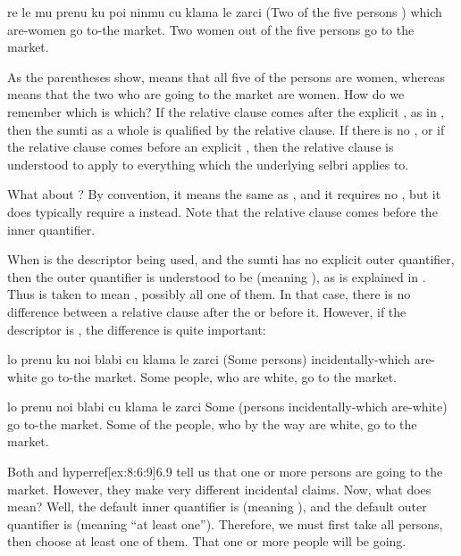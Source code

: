 \begin{example}
re le mu prenu ku poi ninmu\n
\T	cu klama le zarci\n
(Two of the five persons ) which are-women\n
\T	go to-the market.\n
Two women out of the five persons go to the market.
\end{example}

As the parentheses show,  means
    that all five of the persons are women, whereas  means that the two who are going
    to the market are women. How do we remember which is which? If
    the relative clause comes after the explicit , as in , then the sumti as a whole is
    qualified by the relative clause. If there is no , or if
    the relative clause comes before an explicit , then the
    relative clause is understood to apply to everything which the
    underlying selbri applies to. 

What about ? By convention,
    it means the same as , and it
    requires no , but it does typically require a 
    instead. Note that the relative clause comes before the inner
    quantifier.

When  is the descriptor being used, and the sumti has
    no explicit outer quantifier, then the outer quantifier is
    understood to be  (meaning ), as is explained in
    . Thus  is taken
    to mean , possibly all
    one of them. In that case, there is no difference between a
    relative clause after the  or before it. However, if the
    descriptor is , the difference is quite important:
\begin{example}
lo prenu ku noi blabi\n
\T	cu klama le zarci\n
(Some persons) incidentally-which are-white\n
\T	go to-the market.\n
Some people, who are white, go to the market.
\end{example}

\begin{example}
lo prenu noi blabi \n
\T	cu klama le zarci\n
Some (persons incidentally-which are-white)\n
\T	go to-the market.\n
Some of the people, who by the way are white,\n
\T	go to the market.
\end{example}

Both  and hyperref[ex:8:6:9]{6.9} tell us that one or more persons are going
    to the market. However, they make very different incidental
    claims. Now, what does  mean? Well, the
    default inner quantifier is  (meaning ), and the
    default outer quantifier is  (meaning ``at least
    one''). Therefore, we must first take all persons, then choose
    at least one of them. That one or more people will be
    going.

